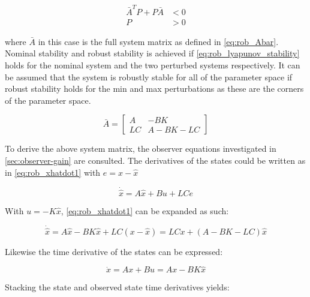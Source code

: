 \begin{equation} \label{eq:rob_lyapunov_stability}
	\begin{split}
	\bar{A}^TP+P\bar{A} &< 0 \\
	P &> 0
	\end{split}
\end{equation}

\noindent where $\bar{A}$ in this case is the full system matrix as defined in \cref{eq:rob_Abar}. Nominal stability and robust stability is achieved if \cref{eq:rob_lyapunov_stability} holds for the nominal system and the two perturbed systems respectively. It can be assumed that the system is robustly stable for all of the parameter space if robust stability holds for the min and max perturbations as these are the corners of the parameter space.

\begin{equation} \label{eq:rob_Abar}
	\bar{A} = \begin{bmatrix}
				A & -BK \\ LC & A-BK-LC
				\end{bmatrix}
\end{equation}

\noindent To derive the above system matrix, the observer equations investigated in \cref{sec:observer-gain} are consulted. The derivatives of the states could be written as in \cref{eq:rob_xhatdot1} with $e = x - \hat{x}$

\begin{equation} \label{eq:rob_xhatdot1}
	\dot{\hat{x}} = A\hat{x} + Bu + LCe
\end{equation}

\noindent With $u = -K\hat{x}$, \cref{eq:rob_xhatdot1} can be expanded as such:

\begin{equation} \label{eq:rob_xhatdot2}
	\dot{\hat{x}} = A\hat{x} - BK\hat{x} + LC(x - \hat{x}) =  LCx + (A - BK - LC)\hat{x}
\end{equation}

\noindent Likewise the time derivative of the states can be expressed:

\begin{equation} \label{eq:rob_xdot}
	\dot{x} = Ax + Bu = Ax - BK\hat{x}
\end{equation}

\noindent Stacking the state and observed state time derivatives yields:

